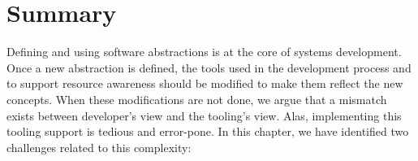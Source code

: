 %





\section{Summary}


Defining and using software abstractions is at the core of systems development.
Once a new abstraction is defined, the tools used in the development process and to support resource awareness should be modified to make them reflect the new concepts.
When these modifications are not done, we argue that a mismatch exists between developer's view and the tooling's view.
Alas, implementing this tooling support is tedious and error-pone.
In this chapter, we have identified two challenges related to this complexity:

